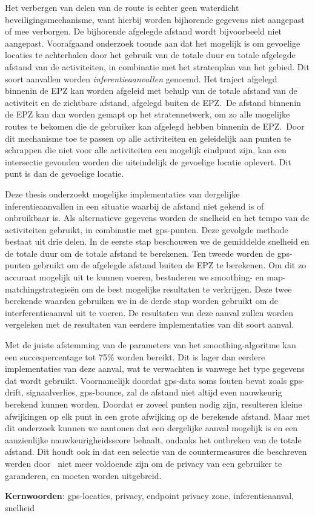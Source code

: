 Het verbergen van delen van de route is echter geen waterdicht
beveiligingsmechanisme, want hierbij worden bijhorende gegevens niet aangepast
of mee verborgen. De bijhorende afgelegde afstand wordt bijvoorbeeld niet
aangepast. Voorafgaand onderzoek toonde aan dat het mogelijk is om gevoelige
locaties te achterhalen door het gebruik van de totale duur en totale afgelegde
afstand van de activiteiten, in combinatie met het stratenplan van het gebied.
Dit soort aanvallen worden \textit{inferentieaanvallen} genoemd. Het traject
afgelegd binnenin de EPZ kan worden afgeleid met behulp van de totale afstand
van de activiteit en de zichtbare afstand, afgelegd buiten de EPZ.\ De afstand
binnenin de EPZ kan dan worden gemapt op het stratennetwerk, om zo alle
mogelijke routes te bekomen die de gebruiker kan afgelegd hebben binnenin de
EPZ.\ Door dit mechanisme toe te passen op alle activiteiten en geleidelijk aan
punten te schrappen die niet voor alle activiteiten een mogelijk eindpunt zijn,
kan een intersectie gevonden worden die uiteindelijk de gevoelige locatie
oplevert. Dit punt is dan de gevoelige locatie.

Deze thesis onderzoekt mogelijke implementaties van dergelijke
inferentieaanvallen in een situatie waarbij de afstand niet gekend is of
onbruikbaar is. Als alternatieve gegevens worden de snelheid en het tempo van
de activiteiten gebruikt, in combinatie met gps-punten. Deze gevolgde methode
bestaat uit drie delen. In de eerste stap beschouwen we de gemiddelde snelheid
en de totale duur om de totale afstand te berekenen. Ten tweede worden de
gps-punten gebruikt om de afgelegde afstand buiten de EPZ te berekenen. Om dit
zo accuraat mogelijk uit te kunnen voeren, bestuderen we smoothing- en
map-matchingstrategieën om de best mogelijke resultaten te verkrijgen. Deze
twee berekende waarden gebruiken we in de derde stap worden gebruikt om de
interferentieaanval uit te voeren. De resultaten van deze aanval zullen worden
vergeleken met de resultaten van eerdere implementaties van dit soort aanval.

Met de juiste afstemming van de parameters van het smoothing-algoritme kan een
succespercentage tot 75\% worden bereikt. Dit is lager dan eerdere
implementaties van deze aanval, wat te verwachten is vanwege het type gegevens
dat wordt gebruikt. Voornamelijk doordat gps-data soms fouten bevat zoals
gps-drift, signaalverlies, gps-bounce, zal de afstand niet altijd even
nauwkeurig berekend kunnen worden. Doordat er zoveel punten nodig zijn,
resulteren kleine afwijkingen op elk punt in een grote afwijking op de
berekende afstand. Maar met dit onderzoek kunnen we aantonen dat een dergelijke
aanval mogelijk is en een aanzienlijke nauwkeurigheidsscore behaalt, ondanks
het ontbreken van de totale afstand. Dit houdt ook in dat een selectie van de
countermeasures die beschreven werden door~\citeauthor{Dhondt} niet meer
voldoende zijn om de privacy van een gebruiker te garanderen, en moeten worden
uitgebreid.

\textbf{Kernwoorden}: gps-locaties, privacy, endpoint privacy zone,
inferentieaanval, snelheid